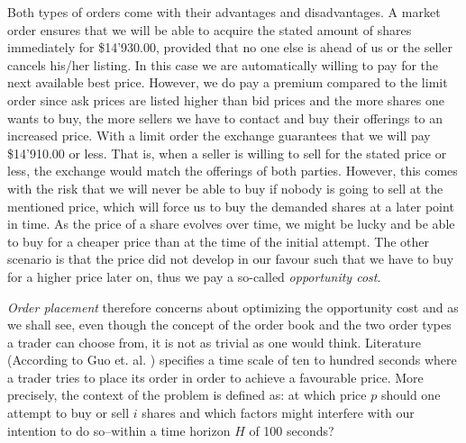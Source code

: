Both types of orders come with their advantages and disadvantages.
A market order ensures that we will be able to acquire the stated amount of shares immediately for \$14'930.00, provided that no one else is ahead of us or the seller cancels his/her listing. 
In this case we are automatically willing to pay for the next available best price.
However, we do pay a premium compared to the limit order since ask prices are listed higher than bid prices and the more shares one wants to buy, the more sellers we have to contact and buy their offerings to an increased price.
With a limit order the exchange guarantees that we will pay \$14'910.00 or less.
That is, when a seller is willing to sell for the stated price or less, the exchange would match the offerings of both parties.
However, this comes with the risk that we will never be able to buy if nobody is going to sell at the mentioned price, which will force us to buy the demanded shares at a later point in time.
As the price of a share evolves over time, we might be lucky and be able to buy for a cheaper price than at the time of the initial attempt.
The other scenario is that the price did not develop in our favour such that we have to buy for a higher price later on, thus we pay a so-called \textit{opportunity cost}.

\textit{Order placement} therefore concerns about optimizing the opportunity cost and as we shall see, even though the concept of the order book and the two order types a trader can choose from, it is not as trivial as one would think.
Literature (According to Guo et. al. \cite{guo2013optimal}) specifies a time scale of ten to hundred seconds where a trader tries to place its order in order to achieve a favourable price.
More precisely, the context of the problem is defined as: at which price $p$ should one attempt to buy or sell $i$ shares and which factors might interfere with our intention to do so--within a time horizon $H$ of 100 seconds?

